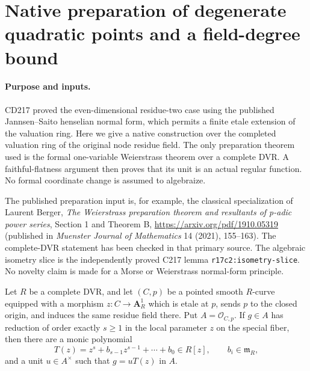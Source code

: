 \section{Native preparation of degenerate quadratic points and a field-degree bound}
\label{r17nf:section}

\paragraph{Purpose and inputs.}
CD217 proved the even-dimensional residue-two case using the
published Jannsen--Saito henselian normal form, which permits a
finite etale extension of the valuation ring. Here we give a
native construction over the completed valuation ring of the
original node residue field. The only preparation theorem used
is the formal one-variable Weierstrass theorem over a complete
DVR. A faithful-flatness argument then proves that its unit is
an actual regular function. No formal coordinate change is
assumed to algebraize.

The published preparation input is, for example, the classical
specialization of Laurent Berger, \emph{The Weierstrass preparation
theorem and resultants of p-adic power series}, Section 1 and
Theorem B, \url{https://arxiv.org/pdf/1910.05319} (published in
\emph{Muenster Journal of Mathematics} 14 (2021), 155--163).
The complete-DVR statement has been checked in that primary
source. The algebraic isometry slice is the independently
proved C217 lemma \texttt{r17c2:isometry-slice}.
No novelty claim is made for a Morse or Weierstrass normal-form
principle.

\begin{lemma}
\label{r17nf:regular-unit}
Let $R$ be a complete DVR, and let $(C,p)$ be a pointed
smooth $R$-curve equipped with a morphism
$z:C\to\mathbf A^1_R$ which is etale at $p$, sends $p$
to the closed origin, and induces the same residue field
there. Put $A=\mathcal O_{C,p}$. If $g\in A$ has
reduction of order exactly $s\ge1$ in the local parameter
$z$ on the special fiber, then there are a monic polynomial
\[
        T(z)=z^s+b_{s-1}z^{s-1}+\cdots+b_0\in R[z],
                       \qquad b_i\in\mathfrak m_R,
\]
and a unit $u\in A^\times$ such that $g=uT(z)$ in $A$.
\end{lemma}

